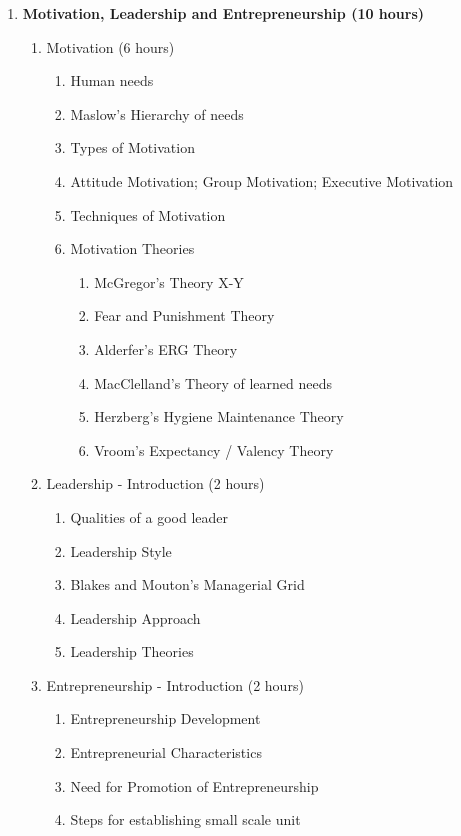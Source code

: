 \begin{enumerate}
  \item \textbf{Motivation, Leadership and Entrepreneurship \hfill (10 hours)}
    \begin{enumerate}
      \item Motivation \hfill (6 hours)
        \begin{enumerate}
          \item Human needs
          \item Maslow's Hierarchy of needs
          \item Types of Motivation
          \item Attitude Motivation; Group Motivation; Executive Motivation
          \item Techniques of Motivation
          \item Motivation Theories
            \begin{enumerate}
              \item McGregor's Theory X-Y
              \item Fear and Punishment Theory
              \item Alderfer's ERG Theory
              \item MacClelland's Theory of learned needs
              \item Herzberg's Hygiene Maintenance Theory
              \item Vroom's Expectancy / Valency Theory
            \end{enumerate}
        \end{enumerate}

      \item Leadership - Introduction \hfill (2 hours)
        \begin{enumerate}
          \item Qualities of a good leader
          \item Leadership Style
          \item Blakes and Mouton's Managerial Grid
          \item Leadership Approach
          \item Leadership Theories
        \end{enumerate}
      
      \item Entrepreneurship - Introduction \hfill (2 hours)
        \begin{enumerate}
          \item Entrepreneurship Development
          \item Entrepreneurial Characteristics
          \item Need for Promotion of Entrepreneurship
          \item Steps for establishing small scale unit
        \end{enumerate}


\end{enumerate}
\end{enumerate}
